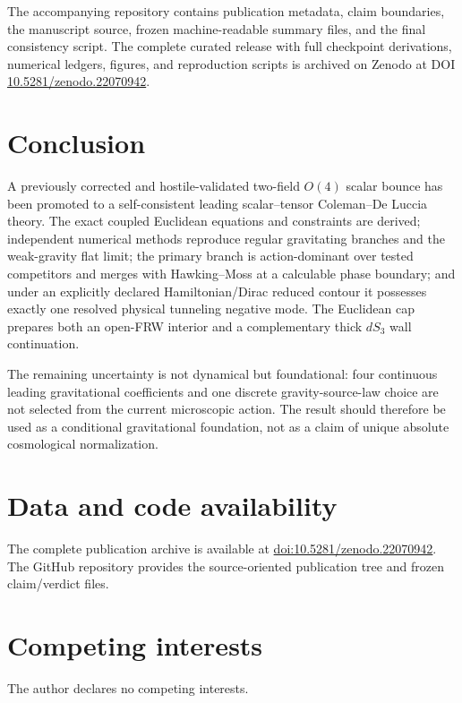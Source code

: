 \documentclass[11pt]{article}
\begin{document}
The accompanying repository contains publication metadata, claim boundaries, the manuscript source, frozen machine-readable summary files, and the final consistency script. The complete curated release with full checkpoint derivations, numerical ledgers, figures, and reproduction scripts is archived on Zenodo at DOI \href{https://doi.org/10.5281/zenodo.22070942}{10.5281/zenodo.22070942}.

\section{Conclusion}

A previously corrected and hostile-validated two-field $O(4)$ scalar bounce has been promoted to a self-consistent leading scalar--tensor Coleman--De Luccia theory. The exact coupled Euclidean equations and constraints are derived; independent numerical methods reproduce regular gravitating branches and the weak-gravity flat limit; the primary branch is action-dominant over tested competitors and merges with Hawking--Moss at a calculable phase boundary; and under an explicitly declared Hamiltonian/Dirac reduced contour it possesses exactly one resolved physical tunneling negative mode. The Euclidean cap prepares both an open-FRW interior and a complementary thick $dS_3$ wall continuation.

The remaining uncertainty is not dynamical but foundational: four continuous leading gravitational coefficients and one discrete gravity-source-law choice are not selected from the current microscopic action. The result should therefore be used as a conditional gravitational foundation, not as a claim of unique absolute cosmological normalization.

\section*{Data and code availability}

The complete publication archive is available at \href{https://doi.org/10.5281/zenodo.22070942}{doi:10.5281/zenodo.22070942}. The GitHub repository provides the source-oriented publication tree and frozen claim/verdict files.

\section*{Competing interests}

The author declares no competing interests.
\end{document}
